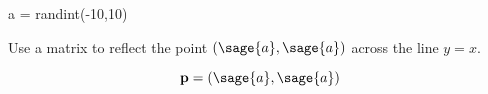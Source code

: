 \documentclass{ximera}
\author{Jenny Sheldon \and Bart Snapp}
\begin{document}
\makerandom
 
\begin{sagesilent}
  a = randint(-10,10)
\end{sagesilent}

\begin{exercise}
  Use a matrix to reflect the point $(\sage{a},\sage{a})$ across the
  line $y=x$.
  \begin{prompt}
    \[
    \vec{p} = (\sage{a},\sage{a})
    \]
  \end{prompt}
\end{exercise}
\end{document}

